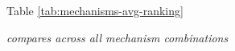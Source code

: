 \documentclass{article}
\begin{document}
Table \ref{tab:mechanisms-avg-ranking}

\textit{compares across all mechanism combinations}








\end{document}
